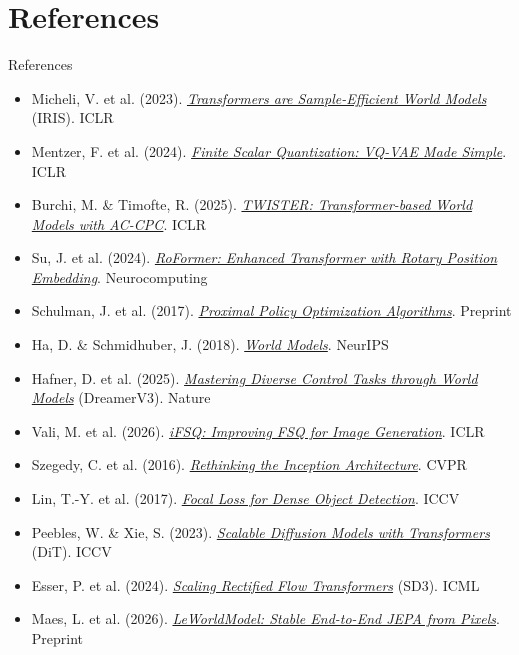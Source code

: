 \documentclass[aspectratio=169]{beamer}
\begin{document}
\section{References}

\begin{frame}[allowframebreaks]{References}
  \small
  \begin{itemize}
    \item Micheli, V. et al. (2023). \href{https://arxiv.org/abs/2209.00588}{\textit{Transformers are Sample-Efficient World Models}} (IRIS). ICLR
    \item Mentzer, F. et al. (2024). \href{https://arxiv.org/abs/2309.15505}{\textit{Finite Scalar Quantization: VQ-VAE Made Simple}}. ICLR
    \item Burchi, M. \& Timofte, R. (2025). \href{https://arxiv.org/abs/2503.04416}{\textit{TWISTER: Transformer-based World Models with AC-CPC}}. ICLR
    \item Su, J. et al. (2024). \href{https://arxiv.org/abs/2104.09864}{\textit{RoFormer: Enhanced Transformer with Rotary Position Embedding}}. Neurocomputing
    \item Schulman, J. et al. (2017). \href{https://arxiv.org/abs/1707.06347}{\textit{Proximal Policy Optimization Algorithms}}. Preprint
    \item Ha, D. \& Schmidhuber, J. (2018). \href{https://arxiv.org/abs/1803.10122}{\textit{World Models}}. NeurIPS
    \item Hafner, D. et al. (2025). \href{https://arxiv.org/abs/2301.04104}{\textit{Mastering Diverse Control Tasks through World Models}} (DreamerV3). Nature
    \item Vali, M. et al. (2026). \href{https://arxiv.org/abs/2601.17124}{\textit{iFSQ: Improving FSQ for Image Generation}}. ICLR
    \item Szegedy, C. et al. (2016). \href{https://arxiv.org/abs/1512.00567}{\textit{Rethinking the Inception Architecture}}. CVPR
    \item Lin, T.-Y. et al. (2017). \href{https://arxiv.org/abs/1708.02002}{\textit{Focal Loss for Dense Object Detection}}. ICCV
    \item Peebles, W. \& Xie, S. (2023). \href{https://arxiv.org/abs/2212.09748}{\textit{Scalable Diffusion Models with Transformers}} (DiT). ICCV
    \item Esser, P. et al. (2024). \href{https://arxiv.org/abs/2403.03206}{\textit{Scaling Rectified Flow Transformers}} (SD3). ICML
    \item Maes, L. et al. (2026). \href{https://arxiv.org/abs/2603.19312}{\textit{LeWorldModel: Stable End-to-End JEPA from Pixels}}. Preprint
  \end{itemize}
\end{frame}
\end{document}

